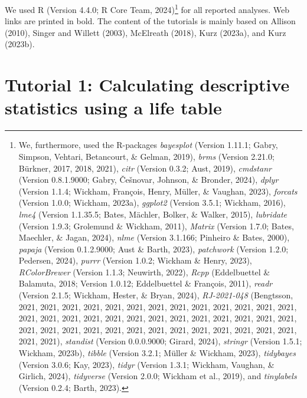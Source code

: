 \documentclass[
  man,floatsintext]{apa6}
\begin{document}
We used R (Version 4.4.0; R Core Team, 2024)\footnote{We, furthermore, used the R-packages \emph{bayesplot} (Version 1.11.1; Gabry, Simpson, Vehtari, Betancourt, \& Gelman, 2019), \emph{brms} (Version 2.21.0; Bürkner, 2017, 2018, 2021), \emph{citr} (Version 0.3.2; Aust, 2019), \emph{cmdstanr} (Version 0.8.1.9000; Gabry, Češnovar, Johnson, \& Bronder, 2024), \emph{dplyr} (Version 1.1.4; Wickham, François, Henry, Müller, \& Vaughan, 2023), \emph{forcats} (Version 1.0.0; Wickham, 2023a), \emph{ggplot2} (Version 3.5.1; Wickham, 2016), \emph{lme4} (Version 1.1.35.5; Bates, Mächler, Bolker, \& Walker, 2015), \emph{lubridate} (Version 1.9.3; Grolemund \& Wickham, 2011), \emph{Matrix} (Version 1.7.0; Bates, Maechler, \& Jagan, 2024), \emph{nlme} (Version 3.1.166; Pinheiro \& Bates, 2000), \emph{papaja} (Version 0.1.2.9000; Aust \& Barth, 2023), \emph{patchwork} (Version 1.2.0; Pedersen, 2024), \emph{purrr} (Version 1.0.2; Wickham \& Henry, 2023), \emph{RColorBrewer} (Version 1.1.3; Neuwirth, 2022), \emph{Rcpp} (Eddelbuettel \& Balamuta, 2018; Version 1.0.12; Eddelbuettel \& François, 2011), \emph{readr} (Version 2.1.5; Wickham, Hester, \& Bryan, 2024), \emph{RJ-2021-048} (Bengtsson, 2021, 2021, 2021, 2021, 2021, 2021, 2021, 2021, 2021, 2021, 2021, 2021, 2021, 2021, 2021, 2021, 2021, 2021, 2021, 2021, 2021, 2021, 2021, 2021, 2021, 2021, 2021, 2021, 2021, 2021, 2021, 2021, 2021, 2021, 2021, 2021, 2021, 2021, 2021, 2021, 2021), \emph{standist} (Version 0.0.0.9000; Girard, 2024), \emph{stringr} (Version 1.5.1; Wickham, 2023b), \emph{tibble} (Version 3.2.1; Müller \& Wickham, 2023), \emph{tidybayes} (Version 3.0.6; Kay, 2023), \emph{tidyr} (Version 1.3.1; Wickham, Vaughan, \& Girlich, 2024), \emph{tidyverse} (Version 2.0.0; Wickham et al., 2019), and \emph{tinylabels} (Version 0.2.4; Barth, 2023).} for all reported analyses. Web links are printed in bold. The content of the tutorials is mainly based on Allison (2010), Singer and Willett (2003), McElreath (2018), Kurz (2023a), and Kurz (2023b).

\section{Tutorial 1: Calculating descriptive statistics using a life table}\label{tutorial-1-calculating-descriptive-statistics-using-a-life-table}
\end{document}
